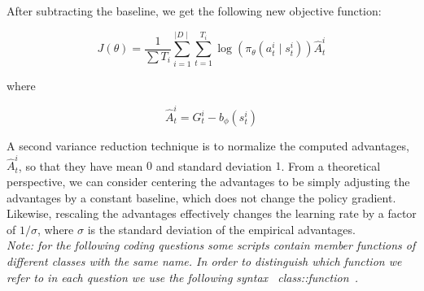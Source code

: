 After subtracting the baseline, we get the following new objective function:

\[ J(\theta) = \frac{1}{\sum T_i} \sum_{i=1}^{\mid D \mid} \sum_{t=1}^{T_i} \log(\pi_\theta(a^i_t \mid s^i_t)) \hat{A}^i_t \]

where

\[\hat{A}^i_t = G^i_t - b_{\phi}(s^i_t)\]

A second variance reduction technique is to normalize the computed advantages, $\hat{A}^i_t$, so that they have mean $0$ and standard deviation $1$. From a theoretical perspective, we can consider centering the advantages to be simply adjusting the advantages by a constant baseline, which does not change the policy gradient. Likewise, rescaling the advantages effectively changes the learning rate by a factor of $1/\sigma$, where $\sigma$ is the standard deviation of the empirical advantages. \\

\textit{Note: for the following coding questions some scripts contain member functions of different classes with the same name. In order to distinguish which function we refer to in each question we use the following syntax ~class::function~.}
\clearpage


\begin{enumerate}[(a)]

	

	

	

	

	

	

	

	

\end{enumerate}